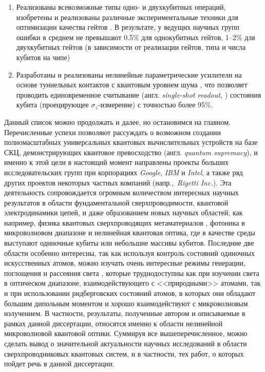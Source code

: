 \begin{enumerate}
	\item Реализованы всевозможные типы одно- и двухкубитных \cite{majer2007coupling} операций, изобретены и реализованы различные экспериментальные техники для оптимизации качества гейтов \cite{knill2008randomized, magesan2011scalable,motzoi2009simple}. В результате, у ведущих научных групп ошибки в среднем не превышают 0.5\% для однокубитных гейтов, 1--2\% для двухкубитных гейтов (в зависимости от реализации гейтов, типа и числа кубитов на чипе)
	\item Разработаны и реализованы нелинейные параметрические усилители на основе туннельных контактов с квантовым уровнем шума \cite{castellanos2007widely,macklin2015near}, что позволяет проводить единовременное считывание (англ. \textit{single-shot readout}, \cite{mallet2009single}) состояния кубита (проецирующее $\sigma_z$-измерение) с точностью более 95\%.
\end{enumerate}
Данный список можно продолжать и далее, но остановимся на главном. Перечисленные успехи позволяют рассуждать о возможном создании полномасштабных универсальных квантовых вычислительных устройств на базе СКЦ, демонстрирующих квантовое превосходство (англ. \textit{quantum supremacy}), и именно к этой цели в настоящий момент направлены проекты больших исследовательских групп при корпорациях \textit{Google}, \textit{IBM} и \textit{Intel}, а также ряд других проектов некоторых частных компаний (напр.,~\textit{Rigetti Inc.}). Эта деятельность сопровождается огромным количеством интересных научных результатов в области фундаментальной сверхпроводимости, квантовой электродинамики цепей, и даже образованием новых научных областей, как например, физика квантовых сверхпроводящих метаматериалов \cite{castellanos2008amplification,macha2014implementation,zagoskin2012superconducting}, фотоника в микроволновом диапазоне \cite{hofheinz2008generation-Fock-states,lang2013correlations,peng2016tuneable} и нелинейная квантовая оптика, где в качестве среды выступают одиночные кубиты или небольшие массивы кубитов. Последние две области особенно интересны, так как используя контроль состояний одиночных искусственных атомов, можно изучать очень интересные режимы генерации, поглощения и рассеяния света \cite{Toyli2016ResSqueez,Wallraff_entangledPhotons,Astafiev2010resonance}, которые труднодоступны как при изучении света в оптическом диапазоне, взаимодействующего с <<природными>> атомами, так и при использовании ридберговских состояний атомов, в которых они обладают большим дипольным моментом и хорошо взаимодействуют с микроволновым излучением. В частности, результаты, полученные автором и описываемые в рамках данной диссертации, относятся именно к области нелинейной микроволновой квантовой оптики. Суммируя все вышеперечисленное, можно сделать вывод о значительной актуальности научных исследований в области сверхпроводниковых квантовых систем, и в частности, тех работ, о которых пойдет речь в данной диссертации.

